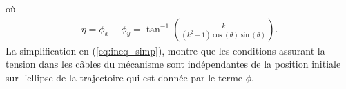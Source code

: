 où 
\begin{align}
\eta = \phi_x-\phi_y = \tan^{-1}\left(\frac{k}{(k^2-1)\cos(\theta)\sin(\theta)}\right).\label{chap1:eq:eta}
\end{align}
La simplification en (\ref{eq:ineq_simp}), montre que les conditions assurant la tension dans les câbles du mécanisme sont indépendantes de la position initiale sur l'ellipse de la trajectoire qui est donnée par le terme $\phi$.

